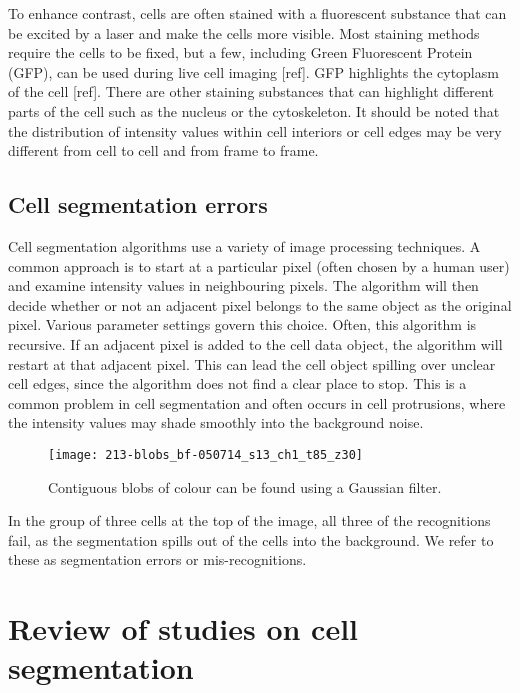 To enhance contrast, cells are often stained with a fluorescent substance that can be excited by a laser and make the cells more visible. Most staining methods require the cells to be fixed, but a few, including Green Fluorescent Protein (GFP), can be used during live cell imaging [ref]. GFP highlights the cytoplasm of the cell [ref]. There are other staining substances that can highlight different parts of the cell such as the nucleus or the cytoskeleton. It should be noted that the distribution of intensity values within cell interiors or cell edges may be very different from cell to cell and from frame to frame.

\subsection{Cell segmentation errors}

Cell segmentation algorithms use a variety of image processing techniques. A common approach is to start at a particular pixel (often chosen by a human user) and examine intensity values in neighbouring pixels. The algorithm will then decide whether or not an adjacent pixel belongs to the same object as the original pixel. Various parameter settings govern this choice. Often, this algorithm is recursive. If an adjacent pixel is added to the cell data object, the algorithm will restart at that adjacent pixel. This can lead the cell object spilling over unclear cell edges, since the algorithm does not find a clear place to stop. This is a common problem in cell segmentation and often occurs in cell protrusions, where the intensity values may shade smoothly into the background noise.

\begin{figure}[htbp!]
\centering
\texttt{[image: 213-blobs\_bf-050714\_s13\_ch1\_t85\_z30]}
\caption[Blob detection]{Contiguous blobs of colour can be found using a Gaussian filter.}
\label{fig:blob_detection_bf}
\end{figure}

In the group of three cells at the top of the image, all three of the recognitions fail, as the segmentation spills out of the cells into the background. We refer to these as segmentation errors or mis-recognitions.

\section{Review of studies on cell segmentation}

